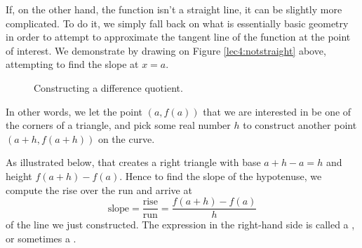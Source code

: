If, on the other hand, the function isn't a straight line, it can be slightly more complicated. To do it, we simply fall back on what is essentially basic geometry in order to attempt to approximate the tangent line of the function at the point of interest. We demonstrate by drawing on Figure \ref{lec4:notstraight} above, attempting to find the slope at $x = a$.

\begin{figure}
	\centering
	\hfill
	\caption{Constructing a difference quotient.}
\end{figure}

In other words, we let the point $(a, f(a))$ that we are interested in be one of the corners of a triangle, and pick some real number $h$ to construct another point $(a + h, f(a + h))$ on the curve.

As illustrated below, that creates a right triangle with base $a + h - a = h$ and height $f(a + h) - f(a)$. Hence to find the slope of the hypotenuse, we compute the rise over the run and arrive at
\[
	\text{slope} = \frac{\text{rise}}{\text{run}} = \frac{f(a + h) - f(a)}{h}
\]
of the line we just constructed. The expression in the right-hand side is called a , or sometimes a .

